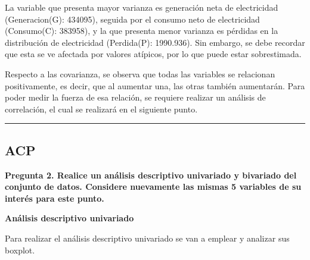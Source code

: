 \documentclass[
]{article}
\begin{document}
La variable que presenta mayor varianza es generación neta de
electricidad (Generacion(G): 434095), seguida por el consumo neto de
electricidad (Consumo(C): 383958), y la que presenta menor varianza es
pérdidas en la distribución de electricidad (Perdida(P): 1990.936). Sin
embargo, se debe recordar que esta se ve afectada por valores atípicos,
por lo que puede estar sobrestimada.

Respecto a las covarianza, se observa que todas las variables se
relacionan positivamente, es decir, que al aumentar una, las otras
también aumentarán. Para poder medir la fuerza de esa relación, se
requiere realizar un análisis de correlación, el cual se realizará en el
siguiente punto.

\begin{center}\rule{0.5\linewidth}{0.5pt}\end{center}

\subsection{ACP}\label{acp}

\noindent\textbf{Pregunta 2. Realice un análisis descriptivo univariado y bivariado del conjunto de datos. Considere nuevamente las mismas 5 variables de su interés para este punto.}

\textbf{Análisis descriptivo univariado}

Para realizar el análisis descriptivo univariado se van a emplear y
analizar sus boxplot.
\end{document}
